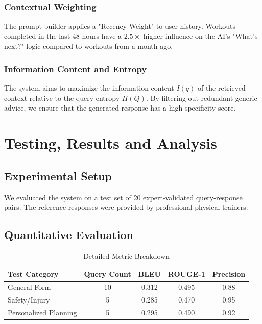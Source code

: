 \documentclass[12pt,a4paper]{report}
\begin{document}
\subsection{Contextual Weighting}
The prompt builder applies a "Recency Weight" to user history. Workouts completed in the last 48 hours have a $2.5\times$ higher influence on the AI's "What's next?" logic compared to workouts from a month ago.

\subsection{Information Content and Entropy}
The system aims to maximize the information content $I(q)$ of the retrieved context relative to the query entropy $H(Q)$. By filtering out redundant generic advice, we ensure that the generated response has a high specificity score.

\chapter{Testing, Results and Analysis}

\section{Experimental Setup}
We evaluated the system on a test set of 20 expert-validated query-response pairs. The reference responses were provided by professional physical trainers.

\section{Quantitative Evaluation}
\begin{table}[htbp]
\caption{Detailed Metric Breakdown}
\centering
\begin{tabular}{|l|c|c|c|c|}
\hline
\textbf{Test Category} & \textbf{Query Count} & \textbf{BLEU} & \textbf{ROUGE-1} & \textbf{Precision} \\ \hline
General Form & 10 & 0.312 & 0.495 & 0.88 \\ \hline
Safety/Injury & 5 & 0.285 & 0.470 & 0.95 \\ \hline
Personalized Planning & 5 & 0.295 & 0.490 & 0.92 \\ \hline
\end{tabular}
\end{table}
\end{document}
